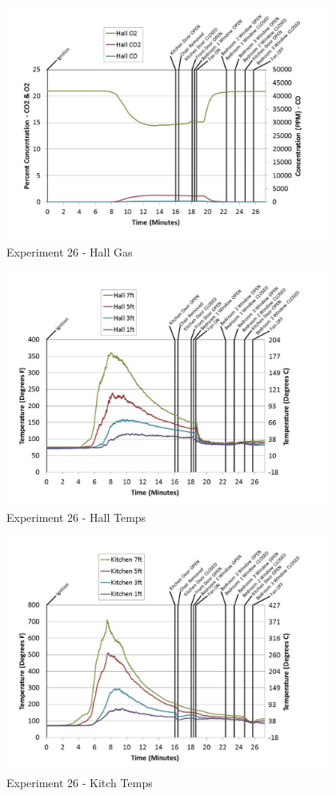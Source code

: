 \documentclass{article}
\begin{document}
\begin{appendices}
	\begin{figure}[h!]
		\centering
		\includegraphics[height=3.05in]{0_Images/Results_Charts/Exp_26_Charts/HallGas.pdf}
		\caption{Experiment 26 - Hall Gas}
	\end{figure}
 
	\clearpage

	\begin{figure}[h!]
		\centering
		\includegraphics[height=3.05in]{0_Images/Results_Charts/Exp_26_Charts/HallTemps.pdf}
		\caption{Experiment 26 - Hall Temps}
	\end{figure}
 

	\begin{figure}[h!]
		\centering
		\includegraphics[height=3.05in]{0_Images/Results_Charts/Exp_26_Charts/KitchTemps.pdf}
		\caption{Experiment 26 - Kitch Temps}
	\end{figure}
 

\end{appendices}
\end{document}
